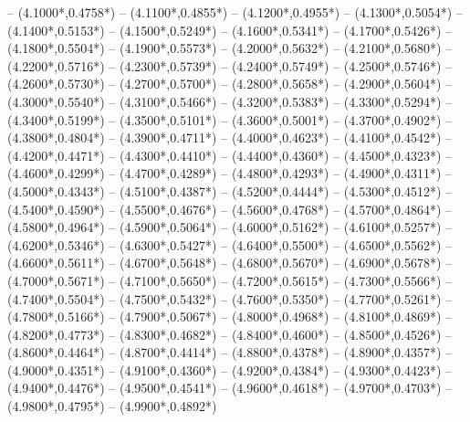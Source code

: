 {	-- ({4.1000*\dx},{0.4758*\dy})
	-- ({4.1100*\dx},{0.4855*\dy})
	-- ({4.1200*\dx},{0.4955*\dy})
	-- ({4.1300*\dx},{0.5054*\dy})
	-- ({4.1400*\dx},{0.5153*\dy})
	-- ({4.1500*\dx},{0.5249*\dy})
	-- ({4.1600*\dx},{0.5341*\dy})
	-- ({4.1700*\dx},{0.5426*\dy})
	-- ({4.1800*\dx},{0.5504*\dy})
	-- ({4.1900*\dx},{0.5573*\dy})
	-- ({4.2000*\dx},{0.5632*\dy})
	-- ({4.2100*\dx},{0.5680*\dy})
	-- ({4.2200*\dx},{0.5716*\dy})
	-- ({4.2300*\dx},{0.5739*\dy})
	-- ({4.2400*\dx},{0.5749*\dy})
	-- ({4.2500*\dx},{0.5746*\dy})
	-- ({4.2600*\dx},{0.5730*\dy})
	-- ({4.2700*\dx},{0.5700*\dy})
	-- ({4.2800*\dx},{0.5658*\dy})
	-- ({4.2900*\dx},{0.5604*\dy})
	-- ({4.3000*\dx},{0.5540*\dy})
	-- ({4.3100*\dx},{0.5466*\dy})
	-- ({4.3200*\dx},{0.5383*\dy})
	-- ({4.3300*\dx},{0.5294*\dy})
	-- ({4.3400*\dx},{0.5199*\dy})
	-- ({4.3500*\dx},{0.5101*\dy})
	-- ({4.3600*\dx},{0.5001*\dy})
	-- ({4.3700*\dx},{0.4902*\dy})
	-- ({4.3800*\dx},{0.4804*\dy})
	-- ({4.3900*\dx},{0.4711*\dy})
	-- ({4.4000*\dx},{0.4623*\dy})
	-- ({4.4100*\dx},{0.4542*\dy})
	-- ({4.4200*\dx},{0.4471*\dy})
	-- ({4.4300*\dx},{0.4410*\dy})
	-- ({4.4400*\dx},{0.4360*\dy})
	-- ({4.4500*\dx},{0.4323*\dy})
	-- ({4.4600*\dx},{0.4299*\dy})
	-- ({4.4700*\dx},{0.4289*\dy})
	-- ({4.4800*\dx},{0.4293*\dy})
	-- ({4.4900*\dx},{0.4311*\dy})
	-- ({4.5000*\dx},{0.4343*\dy})
	-- ({4.5100*\dx},{0.4387*\dy})
	-- ({4.5200*\dx},{0.4444*\dy})
	-- ({4.5300*\dx},{0.4512*\dy})
	-- ({4.5400*\dx},{0.4590*\dy})
	-- ({4.5500*\dx},{0.4676*\dy})
	-- ({4.5600*\dx},{0.4768*\dy})
	-- ({4.5700*\dx},{0.4864*\dy})
	-- ({4.5800*\dx},{0.4964*\dy})
	-- ({4.5900*\dx},{0.5064*\dy})
	-- ({4.6000*\dx},{0.5162*\dy})
	-- ({4.6100*\dx},{0.5257*\dy})
	-- ({4.6200*\dx},{0.5346*\dy})
	-- ({4.6300*\dx},{0.5427*\dy})
	-- ({4.6400*\dx},{0.5500*\dy})
	-- ({4.6500*\dx},{0.5562*\dy})
	-- ({4.6600*\dx},{0.5611*\dy})
	-- ({4.6700*\dx},{0.5648*\dy})
	-- ({4.6800*\dx},{0.5670*\dy})
	-- ({4.6900*\dx},{0.5678*\dy})
	-- ({4.7000*\dx},{0.5671*\dy})
	-- ({4.7100*\dx},{0.5650*\dy})
	-- ({4.7200*\dx},{0.5615*\dy})
	-- ({4.7300*\dx},{0.5566*\dy})
	-- ({4.7400*\dx},{0.5504*\dy})
	-- ({4.7500*\dx},{0.5432*\dy})
	-- ({4.7600*\dx},{0.5350*\dy})
	-- ({4.7700*\dx},{0.5261*\dy})
	-- ({4.7800*\dx},{0.5166*\dy})
	-- ({4.7900*\dx},{0.5067*\dy})
	-- ({4.8000*\dx},{0.4968*\dy})
	-- ({4.8100*\dx},{0.4869*\dy})
	-- ({4.8200*\dx},{0.4773*\dy})
	-- ({4.8300*\dx},{0.4682*\dy})
	-- ({4.8400*\dx},{0.4600*\dy})
	-- ({4.8500*\dx},{0.4526*\dy})
	-- ({4.8600*\dx},{0.4464*\dy})
	-- ({4.8700*\dx},{0.4414*\dy})
	-- ({4.8800*\dx},{0.4378*\dy})
	-- ({4.8900*\dx},{0.4357*\dy})
	-- ({4.9000*\dx},{0.4351*\dy})
	-- ({4.9100*\dx},{0.4360*\dy})
	-- ({4.9200*\dx},{0.4384*\dy})
	-- ({4.9300*\dx},{0.4423*\dy})
	-- ({4.9400*\dx},{0.4476*\dy})
	-- ({4.9500*\dx},{0.4541*\dy})
	-- ({4.9600*\dx},{0.4618*\dy})
	-- ({4.9700*\dx},{0.4703*\dy})
	-- ({4.9800*\dx},{0.4795*\dy})
	-- ({4.9900*\dx},{0.4892*\dy})
}


